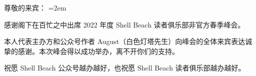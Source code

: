 \documentclass[a4paper,10pt]{article}
\begin{document}
\rmfamily


尊敬的来宾：
\vspace{1em}
\parindent=2em

感谢阁下在百忙之中出席 2022 年度 Shell Beach 读者俱乐部非官方春季峰会。

本人代表主办方和公众号作者 August（白色灯塔先生）向峰会的全体来宾表达诚挚的感谢。本次峰会得以成功举办，离不开你们的支持。

祝愿 Shell Beach 公众号越办越好，也祝愿 Shell Beach 读者俱乐部越办越好。

\end{document}

